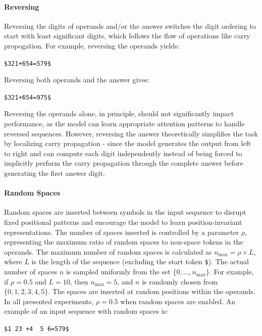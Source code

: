 \paragraph{Reversing}
Reversing the digits of operands and/or the answer switches the digit ordering to start with least significant digits, which follows the flow of operations like carry propogation. For example, reversing the operands yields:
\begin{center}
    \verb|$321+654=579$|
\end{center}
Reversing both operands and the answer gives:
\begin{center}
    \verb|$321+654=975$|
\end{center}
Reversing the operands alone, in principle, should not significantly impact performance, as the model can learn appropriate attention patterns to handle reversed sequences. However, reversing the answer theoretically simplifies the task by localizing carry propagation - since the model generates the output from left to right and can compute each digit independently instead of being forced to implicitly perform the carry propagation through the complete answer before generating the first answer digit.

\paragraph{Random Spaces}
Random spaces are inserted between symbols in the input sequence to disrupt fixed positional patterns and encourage the model to learn position-invariant representations. The number of spaces inserted is controlled by a parameter $\rho$, representing the maximum ratio of random spaces to non-space tokens in the operands. The maximum number of random spaces is calculated as $n_{\text{max}} = \rho \times L$, where $L$ is the length of the sequence (excluding the start token \texttt{\$}). The actual number of spaces $n$ is sampled uniformly from the set $\{0, \dots, n_{\text{max}}\}$. For example, if $\rho = 0.5$ and $L = 10$, then $n_{\text{max}} = 5$, and $n$ is randomly chosen from $\{0, 1, 2, 3, 4, 5\}$. The spaces are inserted at random positions within the operands. In all presented experiments, $\rho = 0.5$ when random spaces are enabled. An example of an input sequence with random spaces is:
\begin{center}
    \verb|$1 23 +4  5 6=579$|
\end{center}

